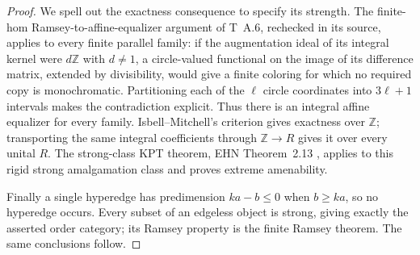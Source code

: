 \begin{proof}
We spell out the exactness consequence to specify its strength.
The finite-hom Ramsey-to-affine-equalizer argument of T~A.6, rechecked
in its source, applies to every finite parallel family: if the
augmentation ideal of its integral kernel were $d\mathbb Z$ with
$d\ne1$, a circle-valued functional on the image of its difference
matrix, extended by divisibility, would give a finite coloring for
which no required copy is monochromatic. Partitioning each of the
$\ell$ circle coordinates into $3\ell+1$ intervals makes the
contradiction explicit. Thus there is an integral affine equalizer
for every family. Isbell--Mitchell's criterion gives exactness over
$\mathbb Z$; transporting the same integral coefficients through
$\mathbb Z\to R$ gives it over every unital $R$. The strong-class
KPT theorem, EHN Theorem~2.13 \cite{D-EHN2019}, applies to this
rigid strong amalgamation class and proves extreme amenability.

Finally a single hyperedge has predimension $ka-b\leq0$ when
$b\geq ka$, so no hyperedge occurs. Every subset of an edgeless
object is strong, giving exactly the asserted order category; its
Ramsey property is the finite Ramsey theorem. The same conclusions
follow.
\end{proof}

